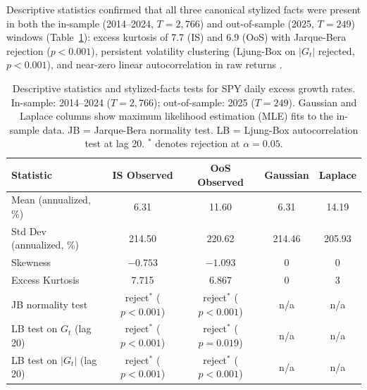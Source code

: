
Descriptive statistics confirmed that all three canonical stylized facts were present in both the in-sample (2014--2024, $T=2{,}766$) and out-of-sample (2025, $T=249$) windows (Table~\ref{tab:descriptive_stats}): excess kurtosis of 7.7 (IS) and 6.9 (OoS) with Jarque-Bera rejection ($p<0.001$), persistent volatility clustering (Ljung-Box on $|G_t|$ rejected, $p<0.001$), and near-zero linear autocorrelation in raw returns \cite{fama_efficient_1970}.

\begin{table}[tp]
\centering
\caption{Descriptive statistics and stylized-facts tests for SPY daily excess growth rates.
    In-sample: 2014--2024 ($T=2{,}766$); out-of-sample: 2025 ($T=249$).
    Gaussian and Laplace columns show maximum likelihood estimation (MLE) fits to the in-sample data.
    JB = Jarque-Bera normality test.
    LB = Ljung-Box autocorrelation test at lag 20.
    $^\ast$ denotes rejection at $\alpha=0.05$.}
\label{tab:descriptive_stats}
\small
\begin{tabular}{@{}lcccc@{}}
\toprule
\textbf{Statistic} & \textbf{IS Observed} & \textbf{OoS Observed} & \textbf{Gaussian} & \textbf{Laplace} \\ \midrule
Mean (annualized, \%)       & 6.31   & 11.60  & 6.31   & 14.19  \\
Std Dev (annualized, \%)    & 214.50 & 220.62 & 214.46 & 205.93 \\
Skewness                    & $-0.753$ & $-1.093$ & 0    & 0      \\
Excess Kurtosis             & 7.715  & 6.867  & 0      & 3      \\
JB normality test           & reject$^\ast$ ($p<0.001$) & reject$^\ast$ ($p<0.001$) & n/a   & n/a   \\
LB test on $G_t$ (lag 20)   & reject$^\ast$ ($p<0.001$) & reject$^\ast$ ($p=0.019$) & n/a   & n/a   \\
LB test on $|G_t|$ (lag 20) & reject$^\ast$ ($p<0.001$) & reject$^\ast$ ($p<0.001$) & n/a   & n/a   \\ \bottomrule
\end{tabular}
\end{table}


